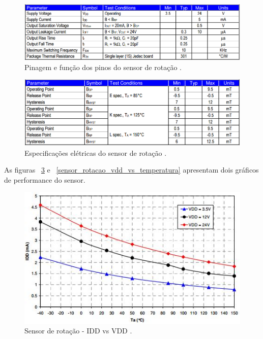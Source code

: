 	\begin{figure}[!htbp]
	  \centering
	  \includegraphics[scale=0.4]{editaveis/figuras/sensor_rotacao_spec_eletrica}
	  \caption[Pinagem e função dos pinos do sensor de rotação]
	  {Pinagem e função dos pinos do sensor de rotação \cite{melexis}.}
	  \label{sensor_rotacao_spec_eletrica}
	\end{figure}
	
	\begin{figure}[!htbp]
	  \centering
	  \includegraphics[scale=0.5]{editaveis/figuras/sensor_rotacao_spec_mag}
	  \caption[Especificações elétricas do sensor de rotação]
	  {Especificações elétricas do sensor de rotação \cite{melexis}.}
	  \label{sensor_rotacao_spec_mag}
	\end{figure}
	
	As figuras ~\ref{sensor_rotacao_idd_vs_vdd} e ~\ref{sensor_rotacao_vdd_vs_temperatura} apresentam dois gráficos
	de performance do sensor.
	
	\begin{figure}[!htbp]
	  \centering
	  \includegraphics[scale=0.5]{editaveis/figuras/sensor_rotacao_idd_vs_vdd}
	  \caption[Sensor de rotação -  IDD vs VDD]
	  {Sensor de rotação -  IDD vs VDD \cite{melexis}.}
	  \label{sensor_rotacao_idd_vs_vdd}
	\end{figure}
	

